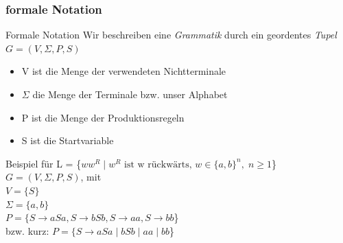 \subsubsection{formale Notation}
\begin{frame}[fragile]{Formale Notation}
    Wir beschreiben eine \alert{\emph{Grammatik}} durch ein geordentes \alert{\emph{Tupel}} $G = (V, \Sigma, P, S)$
    \begin{itemize}
        \item V ist die Menge der verwendeten Nichtterminale
        \item $\Sigma$ die Menge der Terminale bzw. unser Alphabet
        \item P ist die Menge der Produktionsregeln
        \item S ist die Startvariable
    \end{itemize}
    \begin{exampleblock}{Beispiel für  L = \{$ww^R\;|\;w^R\text{ ist w rückwärts, }w \in \{a, b\}^n, \; n \geq 1$\}}
        $G = (V,\Sigma,P,S)$, mit\\
        $V = \{S\}$\\
        $\Sigma = \{a,b\}$\\
        $P = \{S \rightarrow aSa, S \rightarrow bSb, S \rightarrow aa, S \rightarrow bb$\}\\
        \qquad bzw. kurz: $P = \{S \rightarrow aSa\;|\;bSb\;|\;aa\;|\;bb$\}
    \end{exampleblock}
\end{frame}

